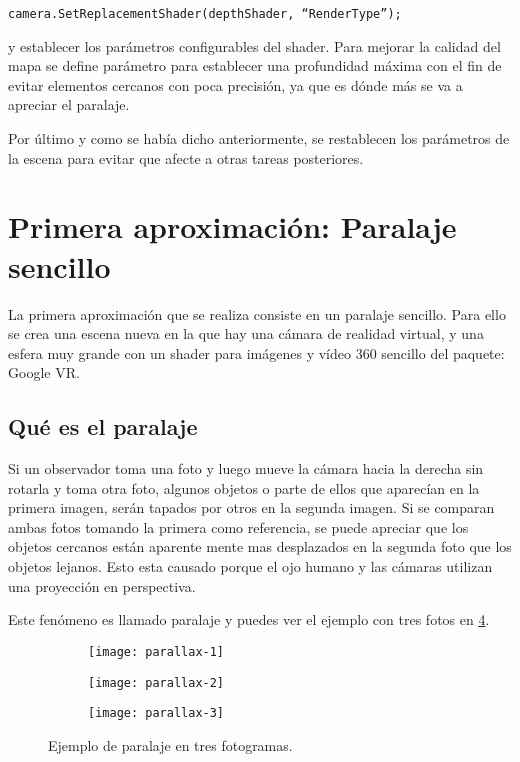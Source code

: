 \texttt{camera.SetReplacementShader(depthShader, ``RenderType'');}

y establecer los parámetros configurables del shader. Para mejorar la calidad del mapa se define parámetro para establecer una profundidad máxima con el fin de evitar elementos cercanos con poca precisión, ya que es dónde más se va a apreciar el paralaje.

Por último y como se había dicho anteriormente, se restablecen los parámetros de la escena para evitar que afecte a otras tareas posteriores.

\section{Primera aproximación: Paralaje sencillo}
La primera aproximación que se realiza consiste en un paralaje sencillo. Para ello se crea una escena nueva en la que hay una cámara de realidad virtual, y una esfera muy grande con un shader para imágenes y vídeo 360 sencillo del paquete: Google VR.

\subsection{Qué es el paralaje} 
Si un observador toma una foto y luego mueve la cámara hacia la derecha sin rotarla y toma otra foto, algunos objetos o parte de ellos que aparecían en la primera imagen, serán tapados por otros en la segunda imagen. Si se comparan ambas fotos tomando la primera como referencia, se puede apreciar que los objetos cercanos están aparente mente mas desplazados en la segunda foto que los objetos lejanos. Esto esta causado porque el ojo humano y las cámaras utilizan una proyección en perspectiva.

Este fenómeno es llamado paralaje y puedes ver el ejemplo con tres fotos en \ref{fig:full-parallax}.

\begin{figure}[H]
\centering
\begin{subfigure}{.32\linewidth}
	\centering
  \texttt{[image: parallax-1]}
  \caption{}
  \label{fig:parallax-1}
\end{subfigure}%
\hspace{.005\linewidth}
\begin{subfigure}{.32\linewidth}
	\centering
  \texttt{[image: parallax-2]}
  \caption{}
  \label{fig:parallax-2}
\end{subfigure}%
\hspace{.005\linewidth}
\begin{subfigure}{.32\linewidth}
	\centering
  \texttt{[image: parallax-3]}
  \caption{}
  \label{fig:parallax-3}
\end{subfigure}
\caption{Ejemplo de paralaje en tres fotogramas.}
\label{fig:full-parallax}
\end{figure}
\FloatBarrier


